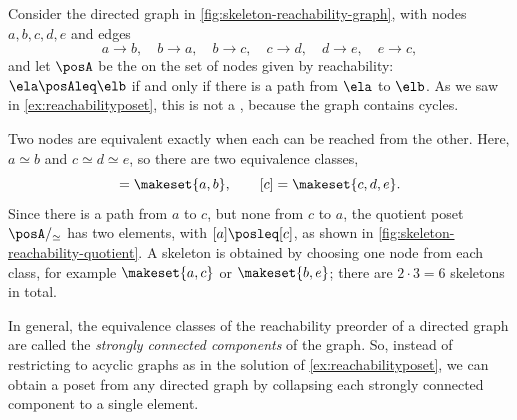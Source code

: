 \begin{example}[Reachability]
    \label{ex:skeleton-reachability}
    Consider the directed graph in \cref{fig:skeleton-reachability-graph}, with nodes $a, b, c, d, e$ and edges
    \begin{equation}
        a \to b, \quad
        b \to a, \quad
        b \to c, \quad
        c \to d, \quad
        d \to e, \quad
        e \to c,
    \end{equation}
    and let $\posA$ be the  on the set of nodes given by reachability: $\ela \posAleq \elb$ if and only if there is a path from $\ela$ to $\elb$.
    As we saw in \cref{ex:reachabilityposet}, this is not a , because the graph contains cycles.

    Two nodes are equivalent exactly when each can be reached from the other.
    Here, $a \simeq b$ and $c \simeq d \simeq e$, so there are two equivalence classes,
    \begin{equation}
        [a] = \makeset{a, b},
        \qquad
        [c] = \makeset{c, d, e}.
    \end{equation}
    Since there is a path from $a$ to $c$, but none from $c$ to $a$, the quotient poset $\posA/_{\simeq}$ has two elements, with $[a] \posleq [c]$, as shown in \cref{fig:skeleton-reachability-quotient}.
    A skeleton is obtained by choosing one node from each class, for example $\makeset{a, c}$ or $\makeset{b, e}$; there are $2 \cdot 3 = 6$ skeletons in total.

    In general, the equivalence classes of the reachability preorder of a directed graph are called the \emph{strongly connected components} of the graph.
    So, instead of restricting to acyclic graphs as in the solution of \cref{ex:reachabilityposet}, we can obtain a poset from any directed graph by collapsing each strongly connected component to a single element.
\end{example}
